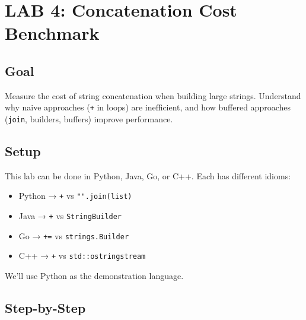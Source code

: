 \documentclass[
  letterpaper,
  DIV=11,
  numbers=noendperiod]{scrreprt}
\providecommand{\tightlist}{%
  \setlength{\itemsep}{0pt}\setlength{\parskip}{0pt}}
\begin{document}
\section{LAB 4: Concatenation Cost
Benchmark}\label{lab-4-concatenation-cost-benchmark}

\subsection{Goal}\label{goal-3}

Measure the cost of string concatenation when building large strings.
Understand why naive approaches (\texttt{+} in loops) are inefficient,
and how buffered approaches (\texttt{join}, builders, buffers) improve
performance.

\subsection{Setup}\label{setup-3}

This lab can be done in Python, Java, Go, or C++. Each has different
idioms:

\begin{itemize}
\tightlist
\item
  Python → \texttt{+} vs \texttt{"".join(list)}
\item
  Java → \texttt{+} vs \texttt{StringBuilder}
\item
  Go → \texttt{+=} vs \texttt{strings.Builder}
\item
  C++ → \texttt{+} vs \texttt{std::ostringstream}
\end{itemize}

We'll use Python as the demonstration language.

\subsection{Step-by-Step}\label{step-by-step-3}
\end{document}

